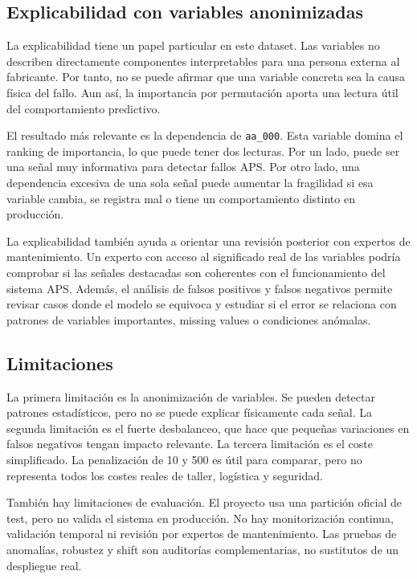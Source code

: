 \documentclass[11pt,a4paper]{article}
\begin{document}
\subsection{Explicabilidad con variables anonimizadas}

La explicabilidad tiene un papel particular en este dataset. Las variables no describen directamente componentes interpretables para una persona externa al fabricante. Por tanto, no se puede afirmar que una variable concreta sea la causa física del fallo. Aun así, la importancia por permutación aporta una lectura útil del comportamiento predictivo.

El resultado más relevante es la dependencia de \texttt{aa\_000}. Esta variable domina el ranking de importancia, lo que puede tener dos lecturas. Por un lado, puede ser una señal muy informativa para detectar fallos APS. Por otro lado, una dependencia excesiva de una sola señal puede aumentar la fragilidad si esa variable cambia, se registra mal o tiene un comportamiento distinto en producción.

La explicabilidad también ayuda a orientar una revisión posterior con expertos de mantenimiento. Un experto con acceso al significado real de las variables podría comprobar si las señales destacadas son coherentes con el funcionamiento del sistema APS. Además, el análisis de falsos positivos y falsos negativos permite revisar casos donde el modelo se equivoca y estudiar si el error se relaciona con patrones de variables importantes, missing values o condiciones anómalas.

\subsection{Limitaciones}

La primera limitación es la anonimización de variables. Se pueden detectar patrones estadísticos, pero no se puede explicar físicamente cada señal. La segunda limitación es el fuerte desbalanceo, que hace que pequeñas variaciones en falsos negativos tengan impacto relevante. La tercera limitación es el coste simplificado. La penalización de 10 y 500 es útil para comparar, pero no representa todos los costes reales de taller, logística y seguridad.

También hay limitaciones de evaluación. El proyecto usa una partición oficial de test, pero no valida el sistema en producción. No hay monitorización continua, validación temporal ni revisión por expertos de mantenimiento. Las pruebas de anomalías, robustez y shift son auditorías complementarias, no sustitutos de un despliegue real.
\end{document}

